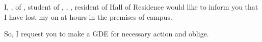 \documentclass[12pt]{article}
\begin{document}
\thispagestyle{empty}
\flushright{\today}
\par
{}
\par
\justify 
I, \yname, \sdo{\gender} of \fname, student of \dept, \insti, \yroll, resident of \org Hall of Residence would like to inform you that I have lost my \thing{\lost} on \ldate at \ltime hours in the premises of \insti campus. \par \justify So, I request you to make a GDE for necessary action and oblige.
\flushleft{\quad}
\vspace{10ex} 
\newline
\vspace{10ex}
\newline
\myAddress
\vspace{8ex}
\end{document}

